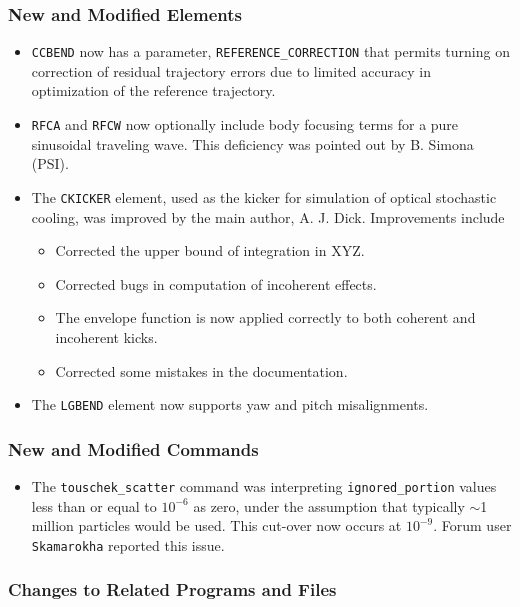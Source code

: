 \documentclass[11pt]{article}
\begin{document}
\subsubsection{New and Modified Elements}
\begin{itemize}
\item \verb|CCBEND| now has a parameter, \verb|REFERENCE_CORRECTION| that permits turning on correction of
  residual trajectory errors due to limited accuracy in optimization of the reference trajectory.
\item \verb|RFCA| and \verb|RFCW| now optionally include body focusing terms for a pure sinusoidal traveling wave.
  This deficiency was pointed out by B. Simona (PSI).
\item The \verb|CKICKER| element, used as the kicker for simulation of optical stochastic cooling, was improved
  by the main author, A. J. Dick. Improvements include
  \begin{itemize}
  \item Corrected the upper bound of integration in XYZ.
  \item Corrected bugs in computation of incoherent effects.
  \item The envelope function is now applied correctly to both coherent and incoherent kicks.
  \item Corrected some mistakes in the documentation.
  \end{itemize}
\item The \verb|LGBEND| element now supports yaw and pitch misalignments.
\end{itemize}

\subsubsection{New and Modified Commands}
\begin{itemize}
\item The \verb|touschek_scatter| command was interpreting \verb|ignored_portion| values less than
  or equal to $10^{-6}$ as zero, under the assumption that typically $\sim$1 million particles
  would be used. This cut-over now occurs at $10^{-9}$. Forum user \verb|Skamarokha| reported this
  issue.
\end{itemize}

\subsubsection{Changes to Related Programs and Files}
\end{document}
